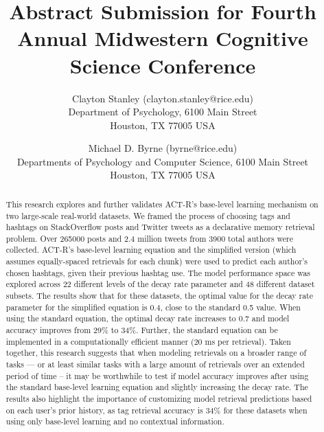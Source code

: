 \documentclass[english]{article}
\title{Abstract Submission for Fourth Annual Midwestern Cognitive Science Conference}
\author{Clayton Stanley (clayton.stanley@rice.edu) \\
  Department of Psychology, 6100 Main Street \\
  Houston, TX 77005 USA 
  \and Michael D. Byrne (byrne@rice.edu) \\
  Departments of Psychology and Computer Science, 6100 Main Street \\
  Houston, TX 77005 USA \\
}
\begin{document}
\maketitle

\begin{abstract}
  This research explores and further validates ACT-R's base-level learning mechanism on two large-scale real-world datasets.
  We framed the process of choosing tags and hashtags on StackOverflow posts and Twitter tweets as a declarative memory retrieval problem.
  Over \num{265000} posts and 2.4 million tweets from \num{3900} total authors were collected. 
  ACT-R's base-level learning equation and the simplified version (which assumes equally-spaced retrievals for each chunk) were used to predict each author's chosen hashtags, given their previous hashtag use.
  The model performance space was explored across 22 different levels of the decay rate parameter and 48 different dataset subsets.
  The results show that for these datasets, the optimal value for the decay rate parameter for the simplified equation is 0.4, close to the standard 0.5 value. 
  When using the standard equation, the optimal decay rate increases to 0.7 and model accuracy improves from 29\% to 34\%. 
  Further, the standard equation can be implemented in a computationally efficient manner (20 ms per retrieval).
  Taken together, this research suggests that when modeling retrievals on a broader range of tasks --- or at least similar tasks with a large amount of retrievals over an extended period of time --
  it may be worthwhile to test if model accuracy improves after using the standard base-level learning equation and slightly increasing the decay rate.
  The results also highlight the importance of customizing model retrieval predictions based on each user's prior history,
  as tag retrieval accuracy is 34\% for these datasets when using only base-level learning and no contextual information.
\end{abstract}
\end{document}

